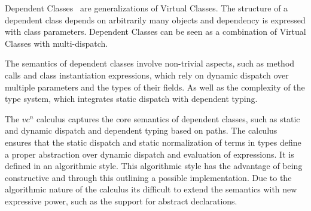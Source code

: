 Dependent Classes~\cite{dc,vaidas:thesis} are generalizations of Virtual Classes.
The structure of a dependent class depends on arbitrarily many objects and
dependency is expressed with class parameters.
Dependent Classes can be seen as a combination of Virtual Classes with multi-dispatch.

The semantics of dependent classes involve non-trivial aspects,
such as method calls and class instantiation expressions,
which rely on dynamic dispatch over multiple parameters and the types of their fields.
As well as the complexity of the type system,
which integrates static dispatch with dependent typing.

The $vc^n$ calculus captures the core semantics of dependent classes,
such as static and dynamic dispatch and dependent typing based on paths.
The calculus ensures that the static dispatch and static normalization of terms in types
define a proper abstraction over dynamic dispatch and evaluation of expressions.
It is defined in an algorithmic style.
This algorithmic style has the advantage of being constructive
and through this outlining a possible implementation.
Due to the algorithmic nature of the calculus
its difficult to extend the semantics with new expressive power,
such as the support for abstract declarations.
%




